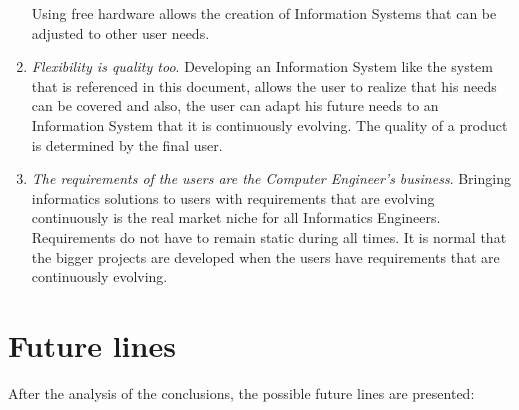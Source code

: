 \begin{enumerate}
Using free hardware allows the creation of Information Systems that can be adjusted to other user needs.

\item \textit{Flexibility is quality too}. Developing an Information System like the system that is referenced in this document, allows the user to realize that his needs can be covered and also, the user can adapt his future needs to an Information System that it is continuously evolving. The quality of a product is determined by the final user.

\item \textit{The requirements of the users are the Computer Engineer's business}. Bringing informatics solutions to users with requirements that are evolving continuously is the real market niche for all Informatics Engineers. Requirements do not have to remain static during all times. It is normal that the bigger projects are developed when the users have requirements that are continuously evolving.

\end{enumerate}




\section{Future lines}

After the analysis of the conclusions, the possible future lines are presented: 

